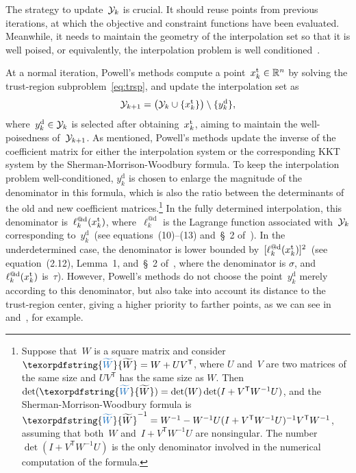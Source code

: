 \documentclass[
    smallextended,  %
    final,          %
]{svjour3}
\newcommand{\set}[2][]{#1\{#2#1\}}
\newcommand{\R}{\mathbb{R}}
\newcommand{\T}{\mathsf{T}}
\newcommand{\drop}{{\text{d}}}
\newcommand{\trust}{{\text{t}}}
\newcommand{\iter}[1][k]{x\ifthenelse{\equal{#1}{}}{}{_{#1}}}
\newcommand{\xpt}[1][k]{\mathcal{Y}\ifthenelse{\equal{#1}{}}{}{_{#1}}}
\newcommand{\modified}[1]{\texorpdfstring{{\color{RoyalBlue}#1}}{#1}}
\begin{document}
The strategy to update~$\xpt$ is crucial.
It should reuse points from previous iterations, at which the objective and constraint functions have been evaluated.
Meanwhile, it needs to maintain the geometry of the interpolation set so that it is well poised, or equivalently, the interpolation problem is well conditioned~\cite{Conn_Scheinberg_Vicente_2009b}.

At a normal iteration, Powell's methods compute a point~$\iter^{\trust} \in \R^n$ by solving the trust-region subproblem~\eqref{eq:trsp}, and update the interpolation set as
\begin{equation}
    \label{eq:xpt-update-tr}
    \xpt[k + 1] = \big(\xpt \cup \set{\iter^{\trust}}\big) \setminus \set{y_k^{\drop}},
\end{equation}
where~$y_k^{\drop} \in \xpt$ is selected after obtaining~$\iter^{\trust}$, aiming to maintain the well-poisedness of~$\xpt[k + 1]$.
As mentioned, Powell's methods update the inverse of the coefficient matrix for either the interpolation system or the corresponding KKT system by the Sherman-Morrison-Woodbury formula.
To keep the interpolation problem well-conditioned, $y_k^{\drop}$ is chosen
to enlarge the magnitude of the denominator in this formula, which is also the ratio between the determinants of the old and new coefficient matrices.\footnote{
    Suppose that~$W$ is a square matrix and consider~$\modified{\widetilde{W}} = W + UV^\T$, where $U$ and~$V$ are two matrices of the same size and $UV^\T$ has the same size as $W$.
    Then $\det(\modified{\widetilde{W}}) = \det(W)\det(I+V^\T W^{-1}U)$, and the Sherman-Morrison-Woodbury formula is $\modified{\widetilde{W}}^{-1} = W^{-1} -W^{-1}U(I+V^\T W^{-1}U)^{-1} V^\T W^{-1}$, assuming that both~$W$ and~$I+V^\T W^{-1}U$ are nonsingular.
    The number~$\det(I+V^\T W^{-1}U)$ is the only denominator involved in the numerical computation of the formula.
}
In the fully determined interpolation, this denominator is~$\ell_k^{@\drop}(\iter^{\trust})$, where~$\ell_k^{@\drop}$ is the Lagrange function associated with~$\xpt$ corresponding to~$y_k^\drop$~(see equations~(10)--(13) and~\S~2 of~\cite{Powell_2001}).
In the underdetermined case, the denominator is lower bounded by~$[\ell_k^{@\drop}(\iter^{\trust})]^2$~(see equation~(2.12), Lemma~1, and~\S~2 of~\cite{Powell_2004c}, where the denominator is $\sigma$, and~$\ell_k^{@\drop}(\iter^{\trust})$ is~$\tau$).
However, Powell's methods do not choose the point~$y_k^\drop$ merely according to this denominator, but also take into account its distance to the trust-region center, giving a higher priority to farther points, as we can see in~\cite[Equation~(56)]{Powell_2002} and~\cite[Equations~(7.4)--(7.5)]{Powell_2006}, for example.
\end{document}
